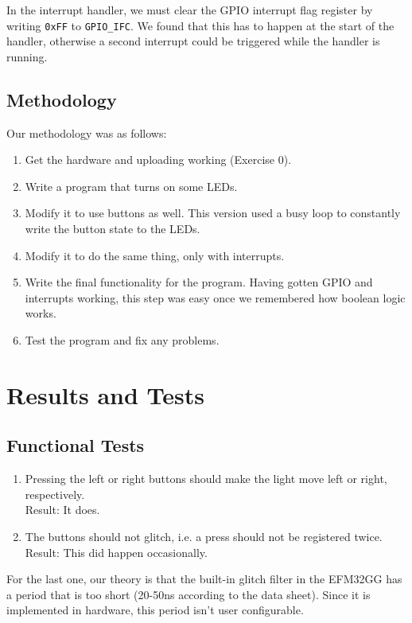 \documentclass[a4paper, 12pt]{article}
\begin{document}
        In the interrupt handler, we must clear the GPIO interrupt flag register by writing \texttt{0xFF} to \texttt{GPIO\_IFC}. We found that this has to happen at the start of the handler, otherwise a second interrupt could be triggered while the handler is running.

    \subsection{Methodology} %
    \label{sub:methodology}
        Our methodology was as follows:
        \begin{enumerate}
            \item Get the hardware and uploading working (Exercise 0).
            \item Write a program that turns on some LEDs.
            \item Modify it to use buttons as well. This version used a busy loop to constantly write the button state to the LEDs.
            \item Modify it to do the same thing, only with interrupts.
            \item Write the final functionality for the program. Having gotten GPIO and interrupts working, this step was easy once we remembered how boolean logic works.
            \item Test the program and fix any problems.
        \end{enumerate}

\section{Results and Tests} %
\label{sec:results_and_tests}
	\subsection{Functional Tests} %
	\label{sub:functional_tests}
		\begin{enumerate}
			\item Pressing the left or right buttons should make the light move left or right, respectively. \\
				  Result: It does.
			\item The buttons should not glitch, i.e. a press should not be registered twice.
				  Result: This did happen occasionally.
		\end{enumerate}
		For the last one, our theory is that the built-in glitch filter in the EFM32GG has a period that is too short (20-50ns according to the data sheet). Since it is implemented in hardware, this period isn't user configurable.
\end{document}
